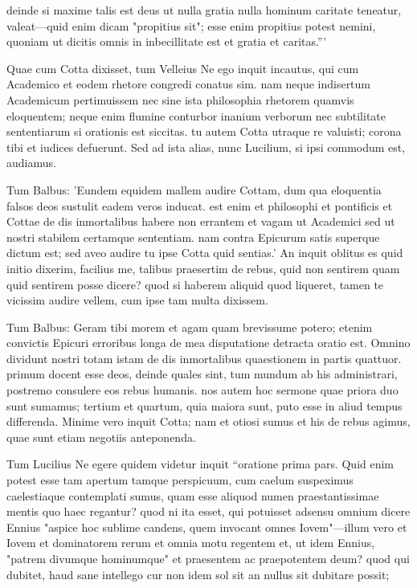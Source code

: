  deinde si maxime talis est deus ut nulla gratia nulla hominum caritate teneatur, valeat—quid enim dicam "propitius sit"; esse enim propitius potest nemini, quoniam ut dicitis omnis in inbecillitate est et gratia et caritas.'''

 Quae cum Cotta dixisset, tum Velleius Ne ego inquit incautus, qui cum Academico et eodem rhetore congredi conatus sim. nam neque indisertum Academicum pertimuissem nec sine ista philosophia rhetorem quamvis eloquentem; neque enim flumine conturbor inanium verborum nec subtilitate sententiarum si orationis est siccitas. tu autem Cotta utraque re valuisti; corona tibi et iudices defuerunt. Sed ad ista alias, nunc Lucilium, si ipsi commodum est, audiamus.

 Tum Balbus: 'Eundem equidem mallem audire Cottam, dum qua eloquentia falsos deos sustulit eadem veros inducat. est enim et philosophi et pontificis et Cottae de dis inmortalibus habere non errantem et vagam ut Academici sed ut nostri stabilem certamque sententiam. nam contra Epicurum satis superque dictum est; sed aveo audire tu ipse Cotta quid sentias.' An inquit oblitus es quid initio dixerim, facilius me, talibus praesertim de rebus, quid non sentirem quam quid sentirem posse dicere? quod si haberem aliquid quod liqueret, tamen te vicissim audire vellem, cum ipse tam multa dixissem.

 Tum Balbus: Geram tibi morem et agam quam brevissume potero; etenim convictis Epicuri erroribus longa de mea disputatione detracta oratio est. Omnino dividunt nostri totam istam de dis inmortalibus quaestionem in partis quattuor. primum docent esse deos, deinde quales sint, tum mundum ab his administrari, postremo consulere eos rebus humanis. nos autem hoc sermone quae priora duo sunt sumamus; tertium et quartum, quia maiora sunt, puto esse in aliud tempus differenda. Minime vero inquit Cotta; nam et otiosi sumus et his de rebus agimus, quae sunt etiam negotiis anteponenda.

 Tum Lucilius Ne egere quidem videtur inquit ``oratione prima pars. Quid enim potest esse tam apertum tamque perspicuum, cum caelum suspeximus caelestiaque contemplati sumus, quam esse aliquod numen praestantissimae mentis quo haec regantur? quod ni ita esset, qui potuisset adsensu omnium dicere Ennius "aspice hoc sublime candens, quem invocant omnes Iovem"—illum vero et Iovem et dominatorem rerum et omnia motu regentem et, ut idem Ennius, "patrem divumque hominumque" et praesentem ac praepotentem deum? quod qui dubitet, haud sane intellego cur non idem sol sit an nullus sit dubitare possit;


